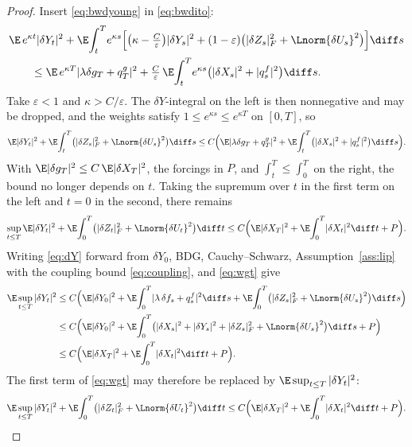 \begin{proof}
Insert \eqref{eq:bwdyoung} in \eqref{eq:bwdito}:
\[
\begin{aligned}
&\E\,e^{\kappa t}|\delta Y_t|^2
+\E\!\int_t^T\!e^{\kappa s}\Big[\big(\kappa-\tfrac{C}{\varepsilon}\big)|\delta Y_s|^2
+(1-\varepsilon)\big(|\delta Z_s|_F^2+\Lnorm{\delta U_s}^2\big)\Big]\diff s\\
&\qquad\le\E\,e^{\kappa T}|\lambda\delta g_T+q^g_T|^2
+\tfrac{C}{\varepsilon}\,\E\!\int_t^T\!e^{\kappa s}\big(|\delta X_s|^2+|q^f_s|^2\big)\diff s .
\end{aligned}
\]
Take $\varepsilon<1$ and $\kappa>C/\varepsilon$. The $\delta Y$-integral on the left is then
nonnegative and may be dropped, and the weights satisfy $1\le e^{\kappa s}\le e^{\kappa T}$
on $[0,T]$, so
\[
\E|\delta Y_t|^2+\E\!\int_t^T\!\big(|\delta Z_s|_F^2+\Lnorm{\delta U_s}^2\big)\diff s
\le C\Big(\E|\lambda\delta g_T+q^g_T|^2
+\E\!\int_t^T\!\big(|\delta X_s|^2+|q^f_s|^2\big)\diff s\Big).
\]
With $\E|\delta g_T|^2\le C\,\E|\delta X_T|^2$, the forcings in $P$, and
$\int_t^T\le\int_0^T$ on the right, the bound no longer depends on $t$. Taking the
supremum over $t$ in the first term on the left and $t=0$ in the second, there remains
\begin{equation}\label{eq:wgt}
\sup_{t\le T}\E|\delta Y_t|^2
+\E\!\int_0^T\!\big(|\delta Z_t|_F^2+\Lnorm{\delta U_t}^2\big)\diff t
\le C\Big(\E|\delta X_T|^2+\E\!\int_0^T\!|\delta X_t|^2\diff t+P\Big).
\end{equation}
Writing \eqref{eq:dY} forward from $\delta Y_0$, BDG, Cauchy--Schwarz,
Assumption~\ref{ass:lip} with the coupling bound \eqref{eq:coupling}, and \eqref{eq:wgt} give
\[
\begin{aligned}
\E\sup_{t\le T}|\delta Y_t|^2
&\le C\Big(\E|\delta Y_0|^2+\E\!\int_0^T\!|\lambda\,\delta f_s+q^f_s|^2\diff s
+\E\!\int_0^T\!\big(|\delta Z_s|_F^2+\Lnorm{\delta U_s}^2\big)\diff s\Big)\\
&\le C\Big(\E|\delta Y_0|^2
+\E\!\int_0^T\!\big(|\delta X_s|^2+|\delta Y_s|^2+|\delta Z_s|_F^2+\Lnorm{\delta U_s}^2\big)\diff s+P\Big)\\
&\le C\Big(\E|\delta X_T|^2+\E\!\int_0^T\!|\delta X_t|^2\diff t+P\Big) .
\end{aligned}
\]
The first term of \eqref{eq:wgt} may therefore be replaced by
$\E\sup_{t\le T}|\delta Y_t|^2$:
\begin{equation}\label{eq:bwd}
\E\sup_{t\le T}|\delta Y_t|^2+\E\!\int_0^T\!\big(|\delta Z_t|_F^2+\Lnorm{\delta U_t}^2\big)\diff t
\le C\Big(\E|\delta X_T|^2+\E\!\int_0^T\!|\delta X_t|^2\diff t+P\Big).
\end{equation}


\end{proof}

